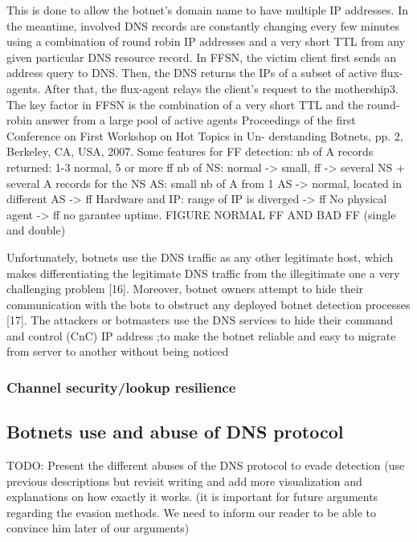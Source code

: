 This is done to allow the botnet’s domain name to have multiple IP addresses. In the meantime,
involved DNS records are constantly changing every few minutes using a combination of round robin
IP addresses and a very short TTL from any given particular DNS resource record.
In FFSN, the victim client first sends an address query to DNS. Then, the DNS returns the IPs of a
subset of active flux-agents. After that, the flux-agent relays the client’s request to the mothership3.
The key factor in FFSN is the combination of a very short TTL and the round-robin answer from a
large pool of active agents
Proceedings of the first Conference on First Workshop on Hot Topics in Un- derstanding Botnets, pp.
2, Berkeley, CA, USA, 2007.
Some features for FF detection: nb of A records returned: 1-3 normal, 5 or more ff nb of NS: normal
-> small, ff -> several NS + several A records for the NS AS: small nb of A from 1 AS -> normal,
located in different AS -> ff Hardware and IP: range of IP is diverged -> ff No physical agent -> ff no
garantee uptime.
FIGURE NORMAL FF AND BAD FF (single and double)

Unfortunately, botnets use the DNS traffic as any other legitimate host, which makes differentiating
the legitimate DNS traffic from the illegitimate one a very challenging problem [16]. Moreover,
botnet owners attempt to hide their communication with the bots to obstruct any deployed botnet
detection processes [17]. The attackers or botmasters use the DNS services to hide their command
and control (CnC) IP address ;to make the botnet reliable and easy to migrate from server to
another without being noticed


\subsubsection{Channel security/lookup resilience}

\subsection{Botnets use and abuse of DNS protocol}
TODO: Present the different abuses of the DNS protocol to evade detection
(use previous descriptions but revisit writing and add more visualization and explanations on how exactly it works. (it is important for future arguments regarding the evasion methods. We need to inform our reader to be able to convince him later of our arguments)
